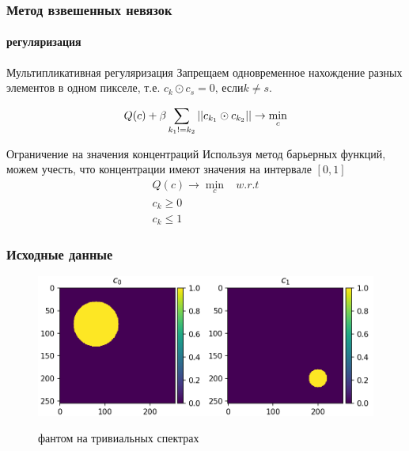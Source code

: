 \documentclass[12pt]{beamer}
\begin{document}
\begin{frame}
\frametitle{Метод взвешенных невязок}
\framesubtitle{регуляризация}
  \begin{block}{Мультипликативная регуляризация}
    Запрещаем одновременное нахождение разных элементов в одном пикселе, т.е. $c_{k} \odot c_{s} = 0 \mbox{, если} k \neq s$.

    $$
    Q(c) + \beta\sum_{k_1 != k_2}\left|\left| c_{k_1} \odot c_{k_2} \right|\right| \to \min \limits_c
    $$
  \end{block}
  \begin{block}{Ограничение на значения концентраций}
  Используя метод барьерных функций, можем учесть, что концентрации имеют значения на интервале $[0, 1]$
    $$
    \begin{array}{lc}
    Q(c) \to \min \limits_c & w.r.t \\
    c_k \geq 0 & \\
    c_k \leq 1
    \end{array}
    $$
  \end{block}
\end{frame}

\begin{frame}
\frametitle{Исходные данные}
\begin{figure}
\centering
\includegraphics[width=\textwidth]{0999}
\\
\caption{фантом на тривиальных спектрах}
\end{figure}
\end{frame}
\end{document}
